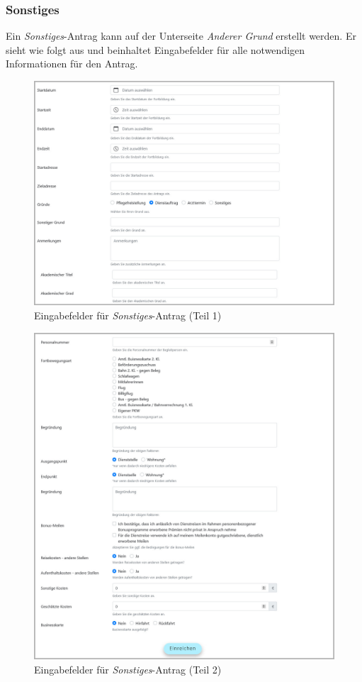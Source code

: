 \subsubsection{Sonstiges}
Ein \textit{Sonstiges}-Antrag kann auf der Unterseite \textit{Anderer Grund} erstellt werden. Er sieht wie folgt aus und beinhaltet Eingabefelder für alle notwendigen Informationen für den Antrag.
\begin{figure}[H]
	\centering
	\includegraphics[width=1\linewidth]{images/rfoster_implementierung/othercause1}
	\caption[\textit{Sonstiges-Antrag} Informationen eingeben (Teil 1)]{Eingabefelder für \textit{Sonstiges}-Antrag (Teil 1)}
	\label{fig:othercause1}
\end{figure}
\begin{figure}[H]
	\centering
	\includegraphics[width=1\linewidth]{images/rfoster_implementierung/othercause2}
	\caption[\textit{Sonstiges-Antrag} Informationen eingeben (Teil 2)]{Eingabefelder für \textit{Sonstiges}-Antrag (Teil 2)}
	\label{fig:othercause2}
\end{figure}
